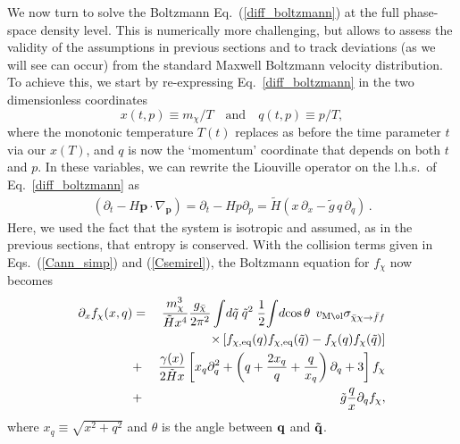 \documentclass[twocolumn,showpacs,amsmath,amssymb,superscriptaddress,nofootinbib]{revtex4-1}
\def\nn{\nonumber}
\newcommand{\bea}{\begin{eqnarray}}
\newcommand{\eea}{\end{eqnarray}}
\newcommand{\p}{\partial}
\begin{document}
We now turn to solve the Boltzmann Eq.~(\ref{diff_boltzmann}) at the full phase-space density level. This is numerically 
more challenging, but allows to assess the validity of the assumptions in previous sections and to track deviations (as we 
will see can occur) from the standard Maxwell Boltzmann velocity distribution.  To achieve this, we  start by 
re-expressing Eq.~\eqref{diff_boltzmann} in the two dimensionless coordinates
$$
x(t,p)\equiv m_\chi/T   \quad \text{and} \quad q(t,p) \equiv p/T,
$$
where the monotonic temperature $T(t)$ replaces as before the time parameter $t$ via our $x(T)$, and $q$ is now the 
`momentum' coordinate that depends on both $t$ and $p$.
In these variables,  we can rewrite the Liouville operator on the  l.h.s.~of Eq.~\eqref{diff_boltzmann} as
\begin{align}
\left(\partial_t-H\mathbf{p}\cdot\nabla_\mathbf{p}\right)=\partial_t - H p \partial_p%
= \tilde H \left( x\,\p_ x   - \tilde g\, q\,\p_q \right)\,.
	\label{eq:L}
\end{align}
Here, we used the fact that the system is isotropic and assumed, as in the previous sections, that entropy is conserved. 
With the collision terms given in Eqs.~(\ref{Cann_simp}) and (\ref{Csemirel}), 
the Boltzmann equation for $f_\chi$ now becomes
\bea
\p_x f_\chi(x,q)
 &=& \frac{m_\chi^3}{\tilde{H} x^4}\frac{g_{\bar \chi} }{2\pi^2}\int{\!d\tilde q\;\tilde q^2}\;  \frac{1}{2}\!\int{\!d\!\cos{\theta}\,}  \; v_{\rm M\o l}  \sigma_{\bar\chi\chi\rightarrow \bar f f} 
\nn\\
&& \times \left[ f_{\chi,{\rm eq}}(q)f_{\chi,{\rm eq}}(\tilde q)-f_\chi(q)f_\chi(\tilde q) \right] \nn\\
&+& \frac{\gamma(x)}{2 \tilde{H} x} \left[x_q \partial^2_q + \left(q+\frac{2 x_q}{ q} + \frac{q}{x_q}\right)\partial_q+3\right]f_\chi\nn\\
&+&  \tilde{g}   \frac{q}{x}  \partial_q f_\chi,
	\label{eq:BEps}
\eea
where $x_q \equiv \sqrt{x^2 +q^2}$ and $\theta$ is the angle between $\bf{q}$ and $\bf{\tilde q}$.\\[-2ex]
 
\end{document}
